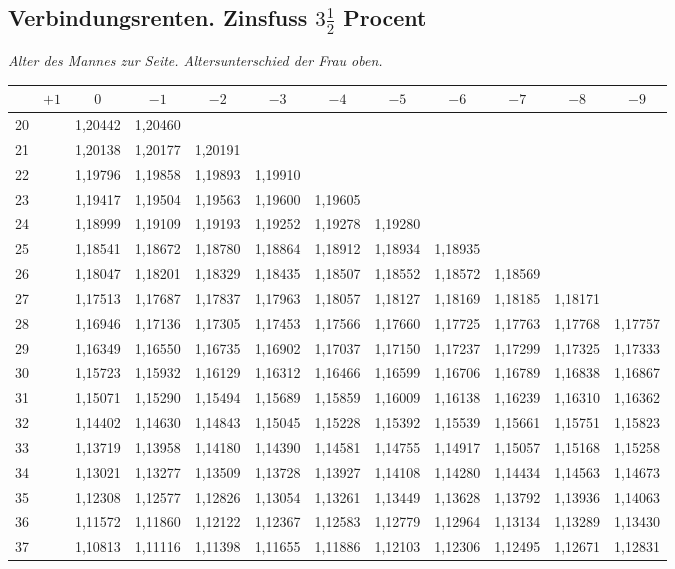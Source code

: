 \documentclass[12pt,a4paper]{article}
\begin{document}
\subsection*{Verbindungsrenten. Zinsfuss $3\frac{1}{2}$ Procent}

\begin{center}
\small
\textit{Alter des Mannes zur Seite. Altersunterschied der Frau oben.}
\end{center}

\begin{center}
\footnotesize
\begin{tabular}{|c|c|c|c|c|c|c|c|c|c|c|c|}
\hline
 & $+1$ & $0$ & $-1$ & $-2$ & $-3$ & $-4$ & $-5$ & $-6$ & $-7$ & $-8$ & $-9$ \\
\hline
20 & & 1,20442 & 1,20460 & & & & & & & & \\
21 & & 1,20138 & 1,20177 & 1,20191 & & & & & & & \\
22 & & 1,19796 & 1,19858 & 1,19893 & 1,19910 & & & & & & \\
23 & & 1,19417 & 1,19504 & 1,19563 & 1,19600 & 1,19605 & & & & & \\
24 & & 1,18999 & 1,19109 & 1,19193 & 1,19252 & 1,19278 & 1,19280 & & & & \\
25 & & 1,18541 & 1,18672 & 1,18780 & 1,18864 & 1,18912 & 1,18934 & 1,18935 & & & \\
26 & & 1,18047 & 1,18201 & 1,18329 & 1,18435 & 1,18507 & 1,18552 & 1,18572 & 1,18569 & & \\
27 & & 1,17513 & 1,17687 & 1,17837 & 1,17963 & 1,18057 & 1,18127 & 1,18169 & 1,18185 & 1,18171 & \\
28 & & 1,16946 & 1,17136 & 1,17305 & 1,17453 & 1,17566 & 1,17660 & 1,17725 & 1,17763 & 1,17768 & 1,17757 \\
29 & & 1,16349 & 1,16550 & 1,16735 & 1,16902 & 1,17037 & 1,17150 & 1,17237 & 1,17299 & 1,17325 & 1,17333 \\
30 & & 1,15723 & 1,15932 & 1,16129 & 1,16312 & 1,16466 & 1,16599 & 1,16706 & 1,16789 & 1,16838 & 1,16867 \\
31 & & 1,15071 & 1,15290 & 1,15494 & 1,15689 & 1,15859 & 1,16009 & 1,16138 & 1,16239 & 1,16310 & 1,16362 \\
32 & & 1,14402 & 1,14630 & 1,14843 & 1,15045 & 1,15228 & 1,15392 & 1,15539 & 1,15661 & 1,15751 & 1,15823 \\
33 & & 1,13719 & 1,13958 & 1,14180 & 1,14390 & 1,14581 & 1,14755 & 1,14917 & 1,15057 & 1,15168 & 1,15258 \\
34 & & 1,13021 & 1,13277 & 1,13509 & 1,13728 & 1,13927 & 1,14108 & 1,14280 & 1,14434 & 1,14563 & 1,14673 \\
35 & & 1,12308 & 1,12577 & 1,12826 & 1,13054 & 1,13261 & 1,13449 & 1,13628 & 1,13792 & 1,13936 & 1,14063 \\
36 & & 1,11572 & 1,11860 & 1,12122 & 1,12367 & 1,12583 & 1,12779 & 1,12964 & 1,13134 & 1,13289 & 1,13430 \\
37 & & 1,10813 & 1,11116 & 1,11398 & 1,11655 & 1,11886 & 1,12103 & 1,12306 & 1,12495 & 1,12671 & 1,12831 \\
\hline
\end{tabular}
\end{center}
\end{document}
